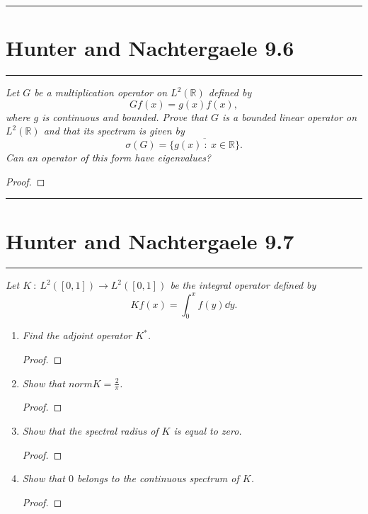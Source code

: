 \documentclass{article} %
\theoremstyle{plain}
\def\Rl{\mathbb{R}}
\newcommand{\problem}[1]{
\vspace{.375cm}
\begin{minipage}{\textwidth}
    \begin{center}
        \noindent\rule{5cm}{1pt}
    \end{center}
    \section{\bf #1}
    \begin{center}
        \noindent\rule{5cm}{1pt}
    \end{center}
    \vspace{0.25cm}
\end{minipage}
}
\numberwithin{equation}{section} %
\numberwithin{figure}{section} %
\numberwithin{table}{section} %
\begin{document}
\problem{Hunter and Nachtergaele 9.6}
\emph{Let $G$ be a multiplication operator on $L^2(\Rl)$ defined by $$Gf(x) = g(x)f(x),$$ where $g$ is continuous and bounded.  Prove that $G$ is a bounded linear operator on $L^2(\Rl)$ and that its spectrum is given by $$\sigma(G) = \overline{\{g(x)\ :\ x \in \Rl\}}.$$  Can an operator of this form have eigenvalues?}
\begin{proof}
\end{proof}









\problem{Hunter and Nachtergaele 9.7}
\emph{Let $K\ :\ L^2([0,1]) \rightarrow L^2([0,1])$ be the integral operator defined by $$Kf(x) = \int_0^x f(y) \dd y.$$}
\begin{enumerate}[\it a)]
    \item
        \emph{Find the adjoint operator $K^*$.}
        \begin{proof}
        \end{proof}
    \item
        \emph{Show that $norm{K} = \frac{2}{\pi}$.}
        \begin{proof}
        \end{proof}
    \item
        \emph{Show that the spectral radius of $K$ is equal to zero.}
        \begin{proof}
        \end{proof}
    \item
        \emph{Show that $0$ belongs to the continuous spectrum of $K$.}
        \begin{proof}
        \end{proof}
\end{enumerate}
\end{document}

